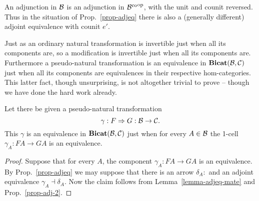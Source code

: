 \documentclass{robinthesisdraft}
\begin{document}
\begin{remark} %
	An adjunction in $\mathcal{B}$ is an adjunction in ${\mathcal{B}^\mathrm{co}}^\mathrm{op}$, with the
	unit and counit reversed. Thus in the situation of Prop.~\ref{prop-adjeq}
	there is also a (generally different) adjoint equivalence with counit $e'$.
\end{remark}
Just as an ordinary natural transformation is invertible just when all its
components are, so a modification is invertible just when all its components
are. Furthermore a pseudo-natural transformation is an equivalence
in $\mathbf{Bicat}(\mathcal{B},\mathcal{C})$ just when all its components are equivalences in
their respective hom-categories. This latter fact, though unsurprising,
is not altogether trivial to prove -- though we have done the hard work
already.
\begin{propn}\label{prop-pneq}
	Let there be given a pseudo-natural transformation
	\[
		\gamma: F\Rightarrow G: \mathcal{B}\to\mathcal{C}.
	\]
	This $\gamma$ is an equivalence in $\mathbf{Bicat}(\mathcal{B},\mathcal{C})$ just
	when for every $A\in\mathcal{B}$ the 1-cell $\gamma_A: FA\to GA$
	is an equivalence.
\end{propn}
\begin{proof}
	Suppose that for every $A$, the component $\gamma_A: FA\to GA$
	is an equivalence. By Prop.~\ref{prop-adjeq} we may suppose that
	there is an arrow $\delta_A: $ and an adjoint equivalence
	$\gamma_A\dashv\delta_A$. Now the claim follows from
	Lemma~\ref{lemma-adjeq-mate} and Prop.~\ref{prop-adj-2}.
\end{proof}
\end{document}
